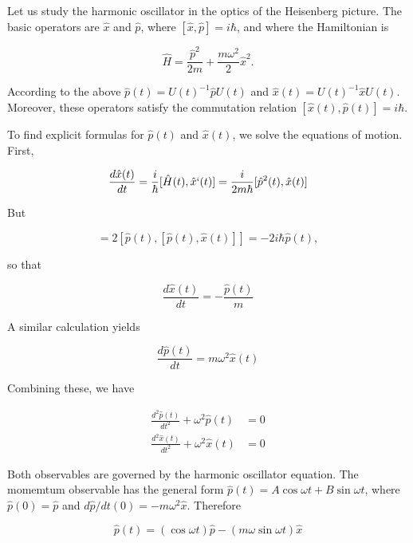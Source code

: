 Let us study the harmonic oscillator in the optics of the Heisenberg picture.  The basic operators are $\hat x$ and $\hat p$, where $[\hat x, \hat p] = i\hbar$, and where the Hamiltonian is

\begin{equation}
\hat H = \frac{\hat p^2}{2m} + \frac{m \omega^2}{2} \hat x^2.
\end{equation}

According to the above $\hat p(t) = U(t)^{-1}\hat p U(t)$ and $\hat x(t) = U(t)^{-1}\hat x U(t)$.  Moreover, these operators satisfy the commutation relation $[\hat x(t), \hat p(t)] = i\hbar$.


To find explicit formulas for $\hat p(t)$ and $\hat x(t)$, we solve the equations of motion.  First,

\begin{equation}
\frac{d\hat x(t)}{dt} = \frac{i}{\hbar}[\hat H(t), \hat x`(t)]
= \frac{i}{2m\hbar}[\hat p^2(t), \hat x(t)]
\end{equation}

But

\begin{equation}
[\hat p^2(t), \hat x(t)] = 2[\hat p(t), [\hat p(t), \hat x(t)]] = -2i\hbar \hat p(t),
\end{equation}

so that

\begin{equation}
\frac{d\hat x(t)}{dt}
= -\frac{\hat p(t)}{m}
\end{equation}

A similar calculation yields

\begin{equation}
\frac{d\hat p(t)}{dt} = m\omega^2 \hat x(t)
\end{equation}

Combining these, we have

\begin{align}
\frac{d^2\hat p(t)}{dt^2} + \omega^2\hat p(t) & = 0 \\
\frac{d^2\hat x(t)}{dt^2} + \omega^2\hat x(t) & = 0
\end{align}

Both observables are governed by the harmonic oscillator equation.
The momemtum observable has the general form $\hat p(t) = A\cos \omega t + B\sin\omega t$, where $\hat p(0) = \hat p$ and $d\hat p/dt(0) = -m\omega^2 \hat x$.
Therefore

\begin{equation}
\hat p(t) = (\cos\omega t) \hat p -  (m\omega \sin \omega t) \hat x
\end{equation}

